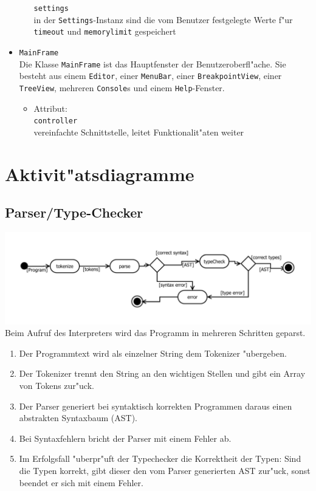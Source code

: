 \documentclass[10pt,a4paper,titlepage]{article}
\begin{document}
\begin{itemize}
\begin{itemize}
\texttt{settings} \\
in der \texttt{Settings}-Instanz sind die vom Benutzer festgelegte Werte f"ur \texttt{timeout} und \texttt{memorylimit} gespeichert
\end{itemize}
\item \texttt{MainFrame} \\
Die Klasse \texttt{MainFrame} ist das Hauptfenster der Benutzeroberfl"ache. Sie besteht aus einem \texttt{Editor}, einer \texttt{MenuBar}, einer \texttt{BreakpointView}, einer \texttt{TreeView}, mehreren \texttt{Console}s und einem \texttt{Help}-Fenster. 
\begin{itemize}
\item Attribut: \\
\texttt{controller} \\
vereinfachte Schnittstelle, leitet Funktionalit"aten weiter \\
\end{itemize}
\end{itemize}

\newpage

\section{Aktivit"atsdiagramme}

\subsection{Parser/Type-Checker}

\includegraphics[scale=0.8]{images/AktivitaetParser.pdf}\newline
Beim Aufruf des Interpreters wird das Programm in mehreren Schritten geparst.
\begin{enumerate}
\item Der Programmtext wird als einzelner String dem Tokenizer "ubergeben.
\item Der Tokenizer trennt den String an den wichtigen Stellen und gibt ein Array von Tokens zur"uck.
\item Der Parser generiert bei syntaktisch korrekten Programmen daraus einen abstrakten Syntaxbaum (AST).
\item Bei Syntaxfehlern bricht der Parser mit einem Fehler ab.
\item Im Erfolgsfall "uberpr"uft der Typechecker die Korrektheit der Typen: Sind die Typen korrekt, gibt dieser den vom Parser generierten AST zur"uck, sonst beendet er sich mit einem Fehler.
\end{enumerate}
\end{document}
